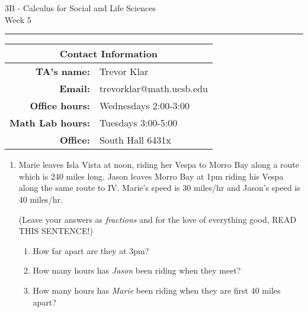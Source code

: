 \documentclass[12pt,letterpaper]{article}
\begin{document}
\thispagestyle{fancy}
\begin{center}
3B - Calculus for Social and Life Sciences\\
Week 5 %
\end{center}

\hrule

\begin{center}
\begin{tabular}{|rl|}
\hline
\multicolumn{2}{|c|}{Contact Information} \\
\hline
\bf{TA's name:} & Trevor Klar \\
\bf{Email:} & trevorklar@math.ucsb.edu \\
\bf{Office hours:} & Wednesdays 2:00-3:00 \\
\bf{Math Lab hours:} & Tuesdays 3:00-5:00 \\
\bf{Office:} & South Hall 6431x \\
\hline
\end{tabular}
\end{center}


\bigskip

\begin{enumerate}

\item 
Marie leaves Isla Vista at noon, riding her Vespa to Morro Bay along a route which is 240 miles long. Jason leaves Morro Bay at 1pm riding his Vespa along the same route to IV. Marie's speed is 30 miles/hr and Jason's speed is 40 miles/hr. 

(Leave your answers as \emph{fractions} and for the love of everything good, READ THIS SENTENCE!)

	\begin{enumerate}[label=(\alph*)]
	\item How far apart are they at 3pm?
	\vfill
	
	\item How many hours has \emph{Jason} been riding when they meet?
	\vfill
	
	\item How many hours has \emph{Marie} been riding when they are first 40 miles apart?
	\vfill
	\end{enumerate}





\end{enumerate}
\end{document}

